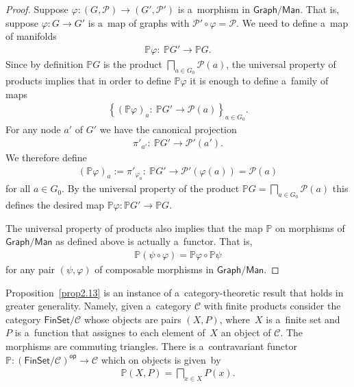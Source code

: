 \documentclass[10pt,a4paper]{amsart}
\numberwithin{equation}{section}
\begin{document}
\begin{proof}
Suppose $\varphi\colon (G,{\mathcal P})\to (G',{\mathcal P}')$ is a~morphism in $\mathsf{Graph}/\mathsf{Man}$.
That is, suppose $\varphi\colon G\to G'$ is a~map of graphs with ${\mathcal P}'\circ \varphi = {\mathcal P}$.
We need to def\/ine a~map of manifolds
\begin{gather*}
\mathbb{P} \varphi\colon \ \mathbb{P} G' \to \mathbb{P} G.
\end{gather*}
Since by def\/inition $\mathbb{P} G$ is the product $\bigsqcap\limits_{a\in G_0} {\mathcal P}(a)$, the universal property of
products implies that in order to def\/ine $\mathbb{P} \varphi$ it is enough to def\/ine a~family of maps
\begin{gather*}
\left\{(\mathbb{P} \varphi)_a\colon \ \mathbb{P} G' \to {\mathcal P} (a)\right\}_{a\in G_0}.
\end{gather*}
For any node $a'$ of $G'$ we have the canonical projection
\begin{gather*}
\pi'_{a'}\colon \ \mathbb{P} G'\to {\mathcal P}' (a').
\end{gather*}
We therefore def\/ine
\begin{gather*}
(\mathbb{P} \varphi)_a:= \pi'_{\varphi_a}\colon \ \mathbb{P} G' \to {\mathcal P}' (\varphi(a)) = {\mathcal P} (a)
\end{gather*}
for all $a\in G_0$.
By the universal property of the product $\mathbb{P} G= \bigsqcap\limits_{a\in G_0} {\mathcal P}(a)$ this def\/ines the desired
map $\mathbb{P} \varphi\colon \mathbb{P} G'\to \mathbb{P} G$.

The universal property of products also implies that the map $\mathbb{P}$ on morphisms of $\mathsf{Graph}/\mathsf{Man}$
as def\/ined above is actually a~functor.
That is,
\begin{gather*}
\mathbb{P} (\psi \circ \varphi) = \mathbb{P} \varphi\circ \mathbb{P} \psi
\end{gather*}
for any pair $(\psi, \varphi)$ of composable morphisms in $\mathsf{Graph}/\mathsf{Man}$.
\end{proof}

\begin{Remark}
Proposition~\ref{prop2.13} is an instance of a~category-theoretic result that holds in greater generality.
Namely, given a~category $\mathscr{C}$ with f\/inite products consider the category $\mathsf{FinSet}/\mathscr{C}$ whose
objects are pairs $(X, P)$, where~$X$ is a~f\/inite set and~$P$ is a~function that assignes to each element of~$X$ an object of $\mathscr{C}$.
The morphisms are commuting triangles.
There is a~contravariant functor $\mathbb{P}: (\mathsf{FinSet}/\mathscr{C})^{{\mathsf{op}}} \to \mathscr{C}$ which on objects is
given~by
\begin{gather*}
\mathbb{P}(X,P) = \bigsqcap_{x\in X} P(x).
\end{gather*}
\end{Remark}
\end{document}

